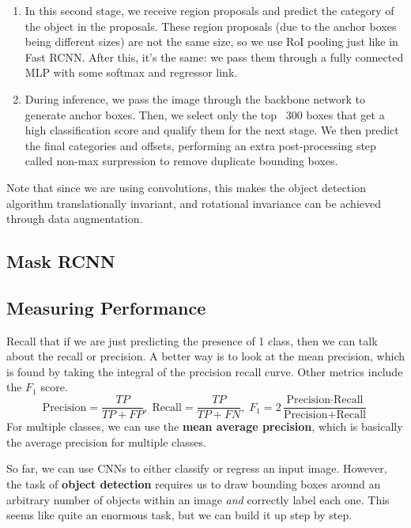 \begin{enumerate}
      \item In this second stage, we receive region proposals and predict the category of the object in the proposals. These region proposals (due to the anchor boxes being different sizes) are not the same size, so we use RoI pooling just like in Fast RCNN. After this, it's the same: we pass them through a fully connected MLP with some softmax and regressor link. 

      \item During inference, we pass the image through the backbone network to generate anchor boxes. Then, we select only the top ~300 boxes that get a high classification score and qualify them for the next stage. We then predict the final categories and offsets, performing an extra post-processing step called non-max surpression to remove duplicate bounding boxes. 
  \end{enumerate}

  Note that since we are using convolutions, this makes the object detection algorithm translationally invariant, and rotational invariance can be achieved through data augmentation. 

\subsection{Mask RCNN}

\subsection{Measuring Performance} 

  Recall that if we are just predicting the presence of 1 class, then we can talk about the recall or precision. A better way is to look at the mean precision, which is found by taking the integral of the precision recall curve. Other metrics include the $F_1$ score. 
  \begin{equation}
    \text{Precision} = \frac{TP}{TP + FP}, \; \text{Recall} = \frac{TP}{TP + FN}, \; F_1 = 2 \frac{\text{Precision} \cdot \text{Recall}}{\text{Precision} + \text{Recall}}
  \end{equation}
  For multiple classes, we can use the \textbf{mean average precision}, which is basically the average precision for multiple classes.

  So far, we can use CNNs to either classify or regress an input image. However, the task of \textbf{object detection} requires us to draw bounding boxes around an arbitrary number of objects within an image \textit{and} correctly label each one. This seems like quite an enormous task, but we can build it up step by step. 


